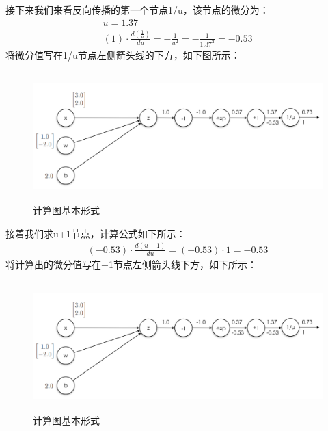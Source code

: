 \documentclass[UTF8]{article}
\begin{document}
接下来我们来看反向传播的第一个节点1/u，该节点的微分为：
\begin{equation}
\begin{aligned}
u=1.37 \\
(1) \cdot \frac{d(\frac{1}{u})}{du}=-\frac{1}{u^2}=-\frac{1}{1.37^2}=-0.53
\end{aligned}
\label{mlp-sigmoid-cg-5}
\end{equation}
将微分值写在1/u节点左侧箭头线的下方，如下图所示：
\begin{figure}[H]
	\caption{计算图基本形式}
	\label{f000043}
	\centering
	\includegraphics[height=5cm]{images/f000043}
\end{figure}
接着我们求u+1节点，计算公式如下所示：
\begin{equation}
\begin{aligned}
(-0.53) \cdot \frac{d(u+1)}{du}=(-0.53) \cdot 1=-0.53
\end{aligned}
\label{mlp-sigmoid-cg-6}
\end{equation}
将计算出的微分值写在+1节点左侧箭头线下方，如下所示：
\begin{figure}[H]
	\caption{计算图基本形式}
	\label{f000044}
	\centering
	\includegraphics[height=5cm]{images/f000044}
\end{figure}
\end{document}
